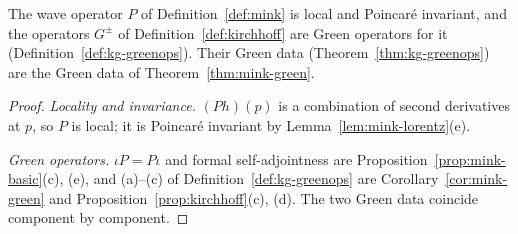 \begin{proposition}\label{prop:kg-wave}
The wave operator $P$ of Definition~\ref{def:mink} is local and Poincar\'e invariant, and the
operators $G^\pm$ of Definition~\ref{def:kirchhoff} are Green operators for it
(Definition~\ref{def:kg-greenops}). Their Green data (Theorem~\ref{thm:kg-greenops}) are the Green
data of Theorem~\ref{thm:mink-green}.
\end{proposition}
\begin{proof}
\emph{Locality and invariance.} $(Ph)(p)$ is a combination of second derivatives at $p$, so $P$ is
local; it is Poincar\'e invariant by Lemma~\ref{lem:mink-lorentz}(e).

\emph{Green operators.} $\iota P=P\iota$ and formal self-adjointness are
Proposition~\ref{prop:mink-basic}(c), (e), and (a)--(c) of Definition~\ref{def:kg-greenops} are
Corollary~\ref{cor:mink-green} and Proposition~\ref{prop:kirchhoff}(c), (d). The two Green data
coincide component by component.
\end{proof}
\endgroup
